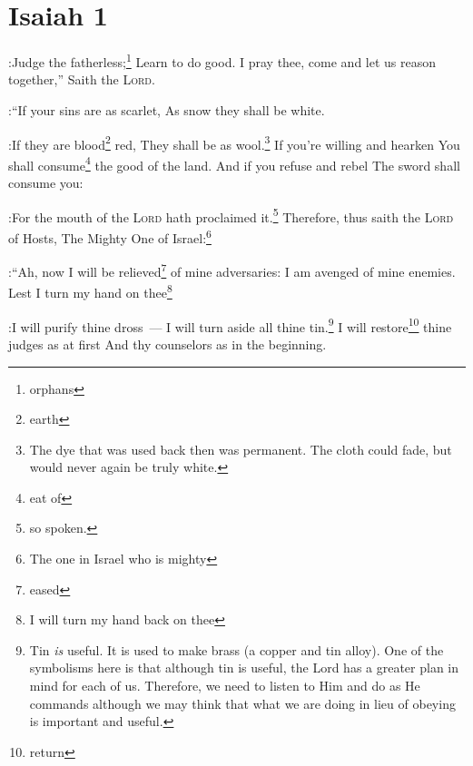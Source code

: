 \section{Isaiah 1}\label{Isaiah 1}
\begin{enumerate}[align=center]
    
    :Judge the fatherless;\footnote{orphans} Learn to do good.%
     I pray thee, come and let us reason together,'' Saith the \textsc{Lord}.%

:``If your sins are as scarlet, As snow they shall be white.%

:If they are blood\footnote{earth} red, They shall be as wool.\footnote{The dye that was used back then was permanent. The cloth could fade, but would never again be truly white.}%
     If you're willing and hearken You shall consume\footnote{eat of} the good of the land.%
     And if you refuse and rebel The sword shall consume you:%

:For the mouth of the \textsc{Lord} hath proclaimed it.\footnote{so spoken.}%
     Therefore, thus saith the \textsc{Lord} of Hosts, The Mighty One of Israel:\footnote{The one in Israel who is mighty}%

:``Ah, now I will be relieved\footnote{eased} of mine adversaries: I am avenged of mine enemies.%
     Lest I turn my hand on thee\footnote{I will turn my hand back on thee}%

:I will purify thine dross~--- I will turn aside all thine tin.\footnote{Tin \emph{is} useful. It is used to make brass (a copper and tin alloy). One of the symbolisms here is that although tin is useful, the Lord has a greater plan in mind for each of us. Therefore, we need to listen to Him and do as He commands although we may think that what we are doing in lieu of obeying is important and useful.}%
     I will restore\footnote{return} thine judges as at first And thy counselors as in the beginning.%


\end{enumerate}
